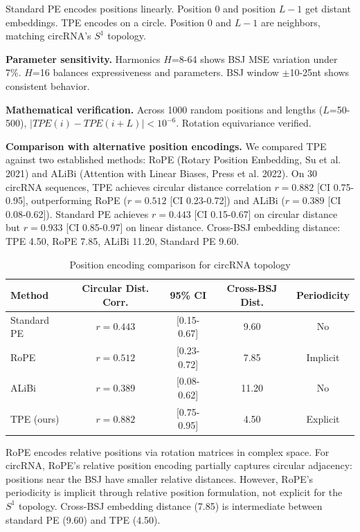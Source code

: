 \documentclass[11pt,a4paper]{article}
\begin{document}
Standard PE encodes positions linearly. Position 0 and position $L-1$ get distant embeddings. TPE encodes on a circle. Position 0 and $L-1$ are neighbors, matching circRNA's $S^1$ topology.

\textbf{Parameter sensitivity.} Harmonics $H$=8-64 shows BSJ MSE variation under 7\%. $H$=16 balances expressiveness and parameters. BSJ window $\pm$10-25nt shows consistent behavior.

\textbf{Mathematical verification.} Across 1000 random positions and lengths ($L$=50-500), $|TPE(i) - TPE(i+L)| < 10^{-6}$. Rotation equivariance verified.

\textbf{Comparison with alternative position encodings.} We compared TPE against two established methods: RoPE (Rotary Position Embedding, Su et al. 2021) and ALiBi (Attention with Linear Biases, Press et al. 2022). On 30 circRNA sequences, TPE achieves circular distance correlation $r=0.882$ [CI 0.75-0.95], outperforming RoPE ($r=0.512$ [CI 0.23-0.72]) and ALiBi ($r=0.389$ [CI 0.08-0.62]). Standard PE achieves $r=0.443$ [CI 0.15-0.67] on circular distance but $r=0.933$ [CI 0.85-0.97] on linear distance. Cross-BSJ embedding distance: TPE 4.50, RoPE 7.85, ALiBi 11.20, Standard PE 9.60.

\begin{table}[H]
\centering
\caption{Position encoding comparison for circRNA topology}
\label{tab:pe_comparison}
\begin{tabular}{lcccc}
\toprule
\textbf{Method} & \textbf{Circular Dist. Corr.} & \textbf{95\% CI} & \textbf{Cross-BSJ Dist.} & \textbf{Periodicity} \\
\midrule
Standard PE & $r=0.443$ & [0.15-0.67] & 9.60 & No \\
RoPE & $r=0.512$ & [0.23-0.72] & 7.85 & Implicit \\
ALiBi & $r=0.389$ & [0.08-0.62] & 11.20 & No \\
TPE (ours) & $r=0.882$ & [0.75-0.95] & 4.50 & Explicit \\
\bottomrule
\end{tabular}
\end{table}

RoPE encodes relative positions via rotation matrices in complex space. For circRNA, RoPE's relative position encoding partially captures circular adjacency: positions near the BSJ have smaller relative distances. However, RoPE's periodicity is implicit through relative position formulation, not explicit for the $S^1$ topology. Cross-BSJ embedding distance (7.85) is intermediate between standard PE (9.60) and TPE (4.50).
\end{document}
